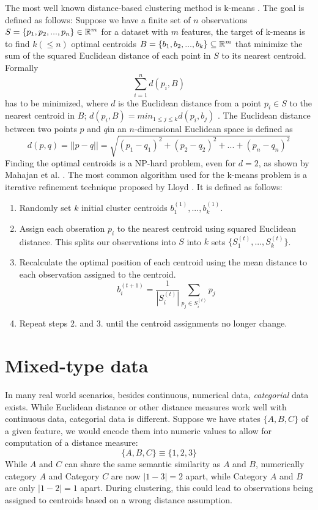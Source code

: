 The most well known distance-based clustering method is k-means \cite{kmeans}. The goal is defined as follows: Suppose we have a finite set of $n$ observations $S=\{p_1, p_2, ..., p_n\} \in \mathbb{R}^m$ for a dataset with $m$ features, the target of k-means is to find $k (\leq n)$ optimal centroids $B=\{b_1, b_2, ..., b_k\} \subseteq \mathbb{R}^m$ that minimize the sum of the squared Euclidean distance of each point in $S$ to its nearest centroid. Formally
$$\sum_{i=1}^n  d(p_i, B)$$
has to be minimized, where $d$ is the Euclidean distance from a point $p_i \in S$ to the nearest centroid in $B$; $d(p_i, B) = min_{1 \leq j \leq k} d(p_i, b_j)$ \cite{kmeans_np_hard}. The Euclidean distance between two points $p$ and $q$in an $n$-dimensional Euclidean space is defined as 
$$d(p, q) = || p - q || = \sqrt{(p_1 - q_1)^2 + (p_2 - q_2)^2 + ... + (p_n - q_n)^2}$$
Finding the optimal centroids is a NP-hard problem, even for $d=2$, as shown by Mahajan et al. \cite{kmeans_np_hard}. The most common algorithm used for the k-means problem is a iterative refinement technique proposed by Lloyd \cite{kmeans_lloyd}. It is defined as follows:
\begin{enumerate} 
	\item Randomly set $k$ initial cluster centroids $b_1^{(1)}, ..., b_k^{(1)}$.
	\item Assign each obseration $p_i$ to the nearest centroid using squared Euclidean distance. This splits our observations into $S$ into $k$ sets $\{S_1^{(t)}, ..., S_k^{(t)}\}$.
	\item Recalculate the optimal position of each centroid using the mean distance to each observation assigned to the centroid. 
$$b_i^{(t+1)} = \frac{1}{|S_i^{(t)}|} \sum_{p_j \in S_i^{(t)}} p_j$$
	\item Repeat steps 2. and 3. until the centroid assignments no longer change.
\end{enumerate}

\section{Mixed-type data}

In many real world scenarios, besides continuous, numerical data, \textit{categorial} data exists. While Euclidean distance or other distance measures work well with continuous data, categorial data is different. Suppose we have states $\{A, B, C\}$ of a given feature, we would encode them into numeric values to allow for computation of a distance measure:
$$\{A, B, C\} \equiv \{1, 2, 3\}$$
While $A$ and $C$ can share the same semantic similarity as $A$ and $B$, numerically category $A$ and Category $C$ are now $|1-3| = 2$ apart, while Category $A$ and $B$ are only $|1-2|=1$ apart. During clustering, this could lead to observations being assigned to centroids based on a wrong distance assumption.

